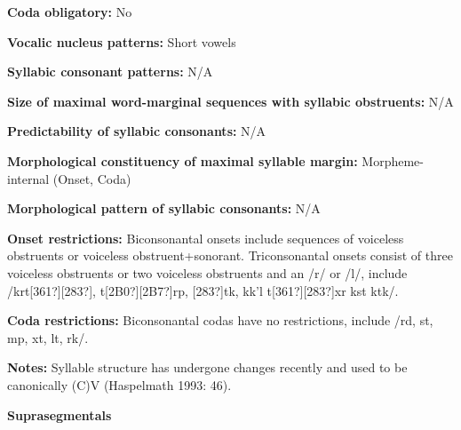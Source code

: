 \begin{styleBody}
\textbf{Coda obligatory:} No
\end{styleBody}

\begin{styleBody}
\textbf{Vocalic nucleus patterns:} Short vowels
\end{styleBody}

\begin{styleBody}
\textbf{Syllabic consonant patterns:} N/A
\end{styleBody}

\begin{styleBody}
\textbf{Size of maximal word{}-marginal sequences with syllabic obstruents:} N/A
\end{styleBody}

\begin{styleBody}
\textbf{Predictability of syllabic consonants:} N/A
\end{styleBody}

\begin{styleBody}
\textbf{Morphological constituency of maximal syllable margin:} Morpheme-internal (Onset, Coda)
\end{styleBody}

\begin{styleBody}
\textbf{Morphological pattern of syllabic consonants:} N/A
\end{styleBody}

\begin{styleBody}
\textbf{Onset restrictions: }Biconsonantal onsets include sequences of voiceless obstruents or voiceless obstruent+sonorant. Triconsonantal onsets consist of three voiceless obstruents or two voiceless obstruents and an /r/ or /l/, include /krt[361?][283?], t[2B0?][2B7?]rp, [283?]tk, kk'l t[361?][283?]xr kst ktk/.
\end{styleBody}

\begin{styleBody}
\textbf{Coda restrictions: }Biconsonantal codas have no restrictions, include /rd, st, mp, xt, lt, rk/.
\end{styleBody}

\begin{styleBody}
\textbf{Notes: }Syllable structure has undergone changes recently and used to be canonically (C)V (Haspelmath 1993: 46).
\end{styleBody}

\begin{styleBody}
\textbf{Suprasegmentals}
\end{styleBody}

